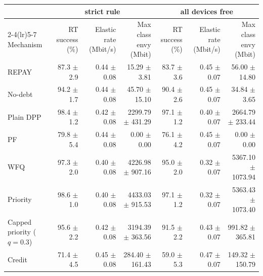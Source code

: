 \begin{tabular}{lrrrrrr}
\toprule
 & \multicolumn{3}{c}{strict rule} & \multicolumn{3}{c}{all devices free} \\
\cmidrule(lr){2-4}\cmidrule(lr){5-7}
Mechanism & RT success (\%) & Elastic rate (Mbit/s) & Max class envy (Mbit) & RT success (\%) & Elastic rate (Mbit/s) & Max class envy (Mbit) \\
\midrule
REPAY & 87.3 $\pm$ 2.9 & 0.44 $\pm$ 0.08 & 15.29 $\pm$ 3.81 & 83.7 $\pm$ 3.6 & 0.45 $\pm$ 0.07 & 56.00 $\pm$ 14.80 \\
No-debt & 94.2 $\pm$ 1.7 & 0.44 $\pm$ 0.08 & 45.70 $\pm$ 15.10 & 90.4 $\pm$ 2.6 & 0.45 $\pm$ 0.07 & 34.84 $\pm$ 3.65 \\
Plain DPP & 98.4 $\pm$ 1.2 & 0.42 $\pm$ 0.08 & 2299.79 $\pm$ 431.29 & 97.1 $\pm$ 1.2 & 0.40 $\pm$ 0.07 & 2664.79 $\pm$ 233.44 \\
PF & 79.8 $\pm$ 5.4 & 0.44 $\pm$ 0.08 & 0.00 $\pm$ 0.00 & 76.1 $\pm$ 4.2 & 0.45 $\pm$ 0.07 & 0.00 $\pm$ 0.00 \\
WFQ & 97.3 $\pm$ 2.0 & 0.40 $\pm$ 0.08 & 4226.98 $\pm$ 907.16 & 95.0 $\pm$ 2.0 & 0.32 $\pm$ 0.07 & 5367.10 $\pm$ 1073.94 \\
Priority & 98.6 $\pm$ 1.0 & 0.40 $\pm$ 0.08 & 4433.03 $\pm$ 915.53 & 97.1 $\pm$ 1.2 & 0.32 $\pm$ 0.07 & 5363.43 $\pm$ 1073.40 \\
Capped priority ($q=0.3$) & 95.6 $\pm$ 2.2 & 0.42 $\pm$ 0.08 & 3194.39 $\pm$ 363.56 & 91.5 $\pm$ 2.2 & 0.43 $\pm$ 0.07 & 991.82 $\pm$ 365.81 \\
Credit & 71.4 $\pm$ 4.5 & 0.45 $\pm$ 0.08 & 284.40 $\pm$ 161.43 & 59.0 $\pm$ 5.3 & 0.47 $\pm$ 0.07 & 149.32 $\pm$ 150.79 \\
\bottomrule
\end{tabular}
